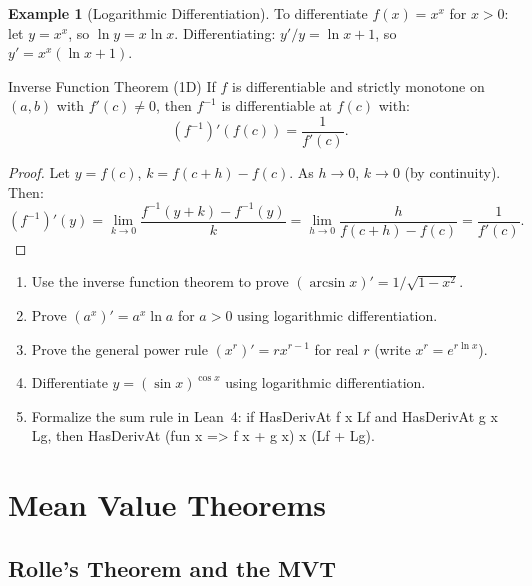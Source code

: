 \documentclass[12pt, openany]{book}
\theoremstyle{plain}
\theoremstyle{definition}
\newtheorem{example}[theorem]{Example}
\theoremstyle{remark}
\newcommand{\li}[1]{{\ttfamily\small\color{tealaccent}#1}}
\begin{document}
\begin{example}[Logarithmic Differentiation]
To differentiate $f(x) = x^x$ for $x > 0$: let $y = x^x$, so $\ln y = x \ln x$. Differentiating: $y'/y = \ln x + 1$, so $y' = x^x(\ln x + 1)$.
\end{example}

\begin{thmbox}{Inverse Function Theorem (1D)}
If $f$ is differentiable and strictly monotone on $(a,b)$ with $f'(c) \neq 0$, then $f^{-1}$ is differentiable at $f(c)$ with:
\[ (f^{-1})'(f(c)) = \frac{1}{f'(c)}. \]
\end{thmbox}
\color{black}

\begin{proof}
Let $y = f(c)$, $k = f(c+h) - f(c)$. As $h \to 0$, $k \to 0$ (by continuity). Then:
\[ (f^{-1})'(y) = \lim_{k \to 0} \frac{f^{-1}(y+k) - f^{-1}(y)}{k} = \lim_{h \to 0} \frac{h}{f(c+h) - f(c)} = \frac{1}{f'(c)}. \]
\end{proof}

\begin{exbox}
\begin{enumerate}
  \item Use the inverse function theorem to prove $(\arcsin x)' = 1/\sqrt{1-x^2}$.
  \item Prove $(a^x)' = a^x \ln a$ for $a > 0$ using logarithmic differentiation.
  \item Prove the general power rule $(x^r)' = rx^{r-1}$ for real $r$ (write $x^r = e^{r \ln x}$).
  \item Differentiate $y = (\sin x)^{\cos x}$ using logarithmic differentiation.
  \item Formalize the sum rule in Lean~4: if \li{HasDerivAt f x Lf} and \li{HasDerivAt g x Lg}, then \li{HasDerivAt (fun x => f x + g x) x (Lf + Lg)}.
\end{enumerate}
\end{exbox}
\color{black}

\chapter{Mean Value Theorems}
\color{black}

\section{Rolle's Theorem and the MVT}
\end{document}
